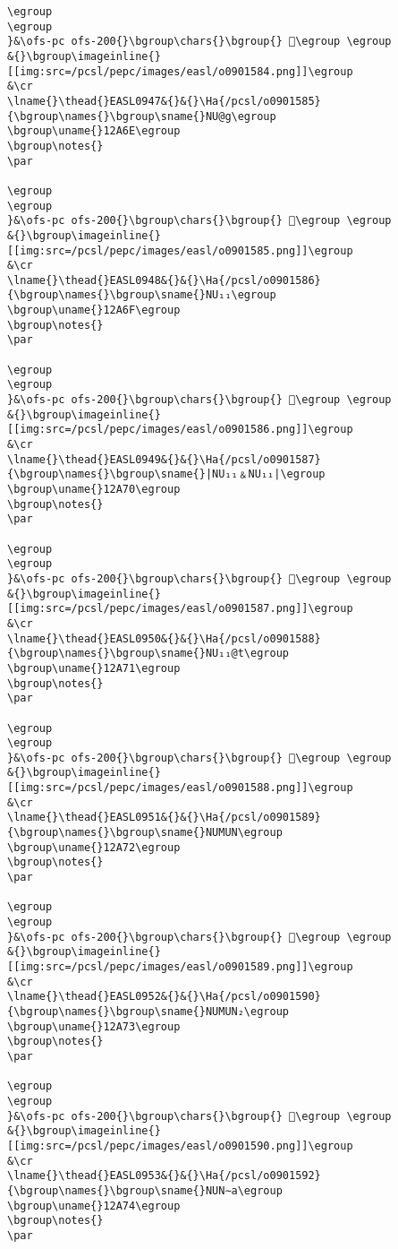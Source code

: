 \begin{verbatim}
\egroup
\egroup
}&\ofs-pc ofs-200{}\bgroup\chars{}\bgroup{} 𒩭\egroup \egroup
&{}\bgroup\imageinline{}[[img:src=/pcsl/pepc/images/easl/o0901584.png]]\egroup
&\cr
\lname{}\thead{}EASL0947&{}&{}\Ha{/pcsl/o0901585}{\bgroup\names{}\bgroup\sname{}NU@g\egroup
\bgroup\uname{}12A6E\egroup
\bgroup\notes{}
\par 

\egroup
\egroup
}&\ofs-pc ofs-200{}\bgroup\chars{}\bgroup{} 𒩮\egroup \egroup
&{}\bgroup\imageinline{}[[img:src=/pcsl/pepc/images/easl/o0901585.png]]\egroup
&\cr
\lname{}\thead{}EASL0948&{}&{}\Ha{/pcsl/o0901586}{\bgroup\names{}\bgroup\sname{}NU₁₁\egroup
\bgroup\uname{}12A6F\egroup
\bgroup\notes{}
\par 

\egroup
\egroup
}&\ofs-pc ofs-200{}\bgroup\chars{}\bgroup{} 𒩯\egroup \egroup
&{}\bgroup\imageinline{}[[img:src=/pcsl/pepc/images/easl/o0901586.png]]\egroup
&\cr
\lname{}\thead{}EASL0949&{}&{}\Ha{/pcsl/o0901587}{\bgroup\names{}\bgroup\sname{}|NU₁₁﹠NU₁₁|\egroup
\bgroup\uname{}12A70\egroup
\bgroup\notes{}
\par 

\egroup
\egroup
}&\ofs-pc ofs-200{}\bgroup\chars{}\bgroup{} 𒩰\egroup \egroup
&{}\bgroup\imageinline{}[[img:src=/pcsl/pepc/images/easl/o0901587.png]]\egroup
&\cr
\lname{}\thead{}EASL0950&{}&{}\Ha{/pcsl/o0901588}{\bgroup\names{}\bgroup\sname{}NU₁₁@t\egroup
\bgroup\uname{}12A71\egroup
\bgroup\notes{}
\par 

\egroup
\egroup
}&\ofs-pc ofs-200{}\bgroup\chars{}\bgroup{} 𒩱\egroup \egroup
&{}\bgroup\imageinline{}[[img:src=/pcsl/pepc/images/easl/o0901588.png]]\egroup
&\cr
\lname{}\thead{}EASL0951&{}&{}\Ha{/pcsl/o0901589}{\bgroup\names{}\bgroup\sname{}NUMUN\egroup
\bgroup\uname{}12A72\egroup
\bgroup\notes{}
\par 

\egroup
\egroup
}&\ofs-pc ofs-200{}\bgroup\chars{}\bgroup{} 𒩲\egroup \egroup
&{}\bgroup\imageinline{}[[img:src=/pcsl/pepc/images/easl/o0901589.png]]\egroup
&\cr
\lname{}\thead{}EASL0952&{}&{}\Ha{/pcsl/o0901590}{\bgroup\names{}\bgroup\sname{}NUMUN₂\egroup
\bgroup\uname{}12A73\egroup
\bgroup\notes{}
\par 

\egroup
\egroup
}&\ofs-pc ofs-200{}\bgroup\chars{}\bgroup{} 𒩳\egroup \egroup
&{}\bgroup\imageinline{}[[img:src=/pcsl/pepc/images/easl/o0901590.png]]\egroup
&\cr
\lname{}\thead{}EASL0953&{}&{}\Ha{/pcsl/o0901592}{\bgroup\names{}\bgroup\sname{}NUN∼a\egroup
\bgroup\uname{}12A74\egroup
\bgroup\notes{}
\par 


\end{verbatim}
